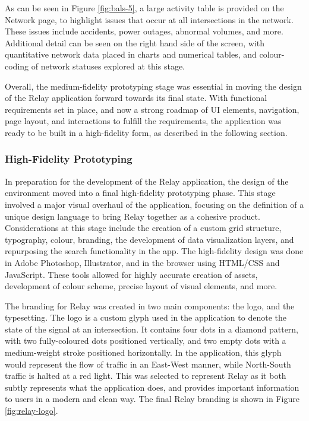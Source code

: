 \documentclass{report}
\begin{document}
As can be seen in Figure \ref{fig:bals-5}, a large activity table is provided on the Network page, to highlight issues that occur at all intersections in the network.
These issues include accidents, power outages, abnormal volumes, and more.
Additional detail can be seen on the right hand side of the screen, with quantitative network data placed in charts and numerical tables, and colour-coding of network statuses explored at this stage.

Overall, the medium-fidelity prototyping stage was essential in moving the design of the Relay application forward towards its final state.
With functional requirements set in place, and now a strong roadmap of UI elements, navigation, page layout, and interactions to fulfill the requirements, the application was ready to be built in a high-fidelity form, as described in the following section.

\subsubsection{High-Fidelity Prototyping}
In preparation for the development of the Relay application, the design of the environment moved into a final high-fidelity prototyping phase.
This stage involved a major visual overhaul of the application, focusing on the definition of a unique design language to bring Relay together as a cohesive product.
Considerations at this stage include the creation of a custom grid structure, typography, colour, branding, the development of data visualization layers, and repurposing the search functionality in the app.
The high-fidelity design was done in Adobe Photoshop, Illustrator, and in the browser using HTML/CSS and JavaScript.
These tools allowed for highly accurate creation of assets, development of colour scheme, precise layout of visual elements, and more.

The branding for Relay was created in two main components: the logo, and the typesetting.
The logo is a custom glyph used in the application to denote the state of the signal at an intersection.
It contains four dots in a diamond pattern, with two fully-coloured dots positioned vertically, and two empty dots with a medium-weight stroke positioned horizontally.
In the application, this glyph would represent the flow of traffic in an East-West manner, while North-South traffic is halted at a red light.
This was selected to represent Relay as it both subtly represents what the application does, and provides important information to users in a modern and clean way.
The final Relay branding is shown in Figure \ref{fig:relay-logo}. \\ \\
\end{document}
